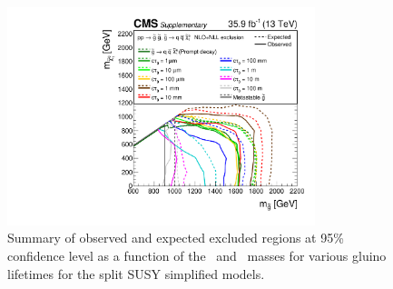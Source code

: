\begin{figure}[!t]
\centering
\includegraphics[width=0.8\textwidth]{figs/results/T1qqqqLLSummary}
\caption{Summary of observed and expected excluded regions at 95\% confidence 
level as a function of the \gluino~and \neutralino~masses for various gluino 
lifetimes for the split SUSY simplified models.}
\label{fig:limits-summary} 
\end{figure}

